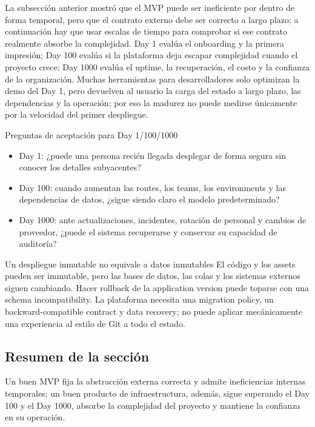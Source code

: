 La subsección anterior mostró que el MVP puede ser ineficiente por dentro de forma temporal, pero que el contrato externo debe ser correcto a largo plazo; a continuación hay que usar escalas de tiempo para comprobar si ese contrato realmente absorbe la complejidad. Day 1 evalúa el onboarding y la primera impresión; Day 100 evalúa si la plataforma deja escapar complejidad cuando el proyecto crece; Day 1000 evalúa el uptime, la recuperación, el costo y la confianza de la organización. Muchas herramientas para desarrolladores solo optimizan la demo del Day 1, pero devuelven al usuario la carga del estado a largo plazo, las dependencias y la operación; por eso la madurez no puede medirse únicamente por la velocidad del primer despliegue.


\begin{importantbox}{Preguntas de aceptación para Day 1/100/1000}
\begin{itemize}
  \item Day 1: ¿puede una persona recién llegada desplegar de forma segura sin conocer los detalles subyacentes?
  \item Day 100: cuando aumentan las routes, los teams, los environments y las dependencias de datos, ¿sigue siendo claro el modelo predeterminado?
  \item Day 1000: ante actualizaciones, incidentes, rotación de personal y cambios de proveedor, ¿puede el sistema recuperarse y conservar su capacidad de auditoría?
\end{itemize}
\end{importantbox}

\begin{warningbox}{Un despliegue inmutable no equivale a datos inmutables}
El código y los assets pueden ser immutable, pero las bases de datos, las colas y los sistemas externos siguen cambiando. Hacer rollback de la application version puede toparse con una schema incompatibility. La plataforma necesita una migration policy, un backward-compatible contract y data recovery; no puede aplicar mecánicamente una experiencia al estilo de Git a todo el estado.
\end{warningbox}

\subsection{Resumen de la sección}

Un buen MVP fija la abstracción externa correcta y admite ineficiencias internas temporales; un buen producto de infraestructura, además, sigue superando el Day 100 y el Day 1000, absorbe la complejidad del proyecto y mantiene la confianza en su operación.
